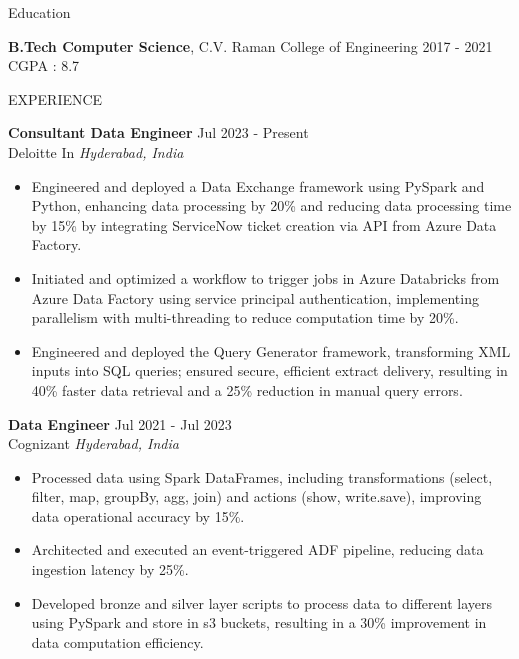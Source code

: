 \documentclass{resume} %
\begin{document}
\begin{rSection}{Education}

{\bf B.Tech Computer Science}, C.V. Raman College of Engineering   \hfill {2017 - 2021 }\\
CGPA : 8.7 
\end{rSection}
\begin{rSection}{EXPERIENCE}

\textbf{Consultant Data Engineer} \hfill Jul 2023 - Present\\
Deloitte In \hfill \textit{Hyderabad, India}
 \begin{itemize}
    \itemsep -3pt {} 

    \item Engineered and deployed a Data Exchange framework using PySpark and Python, enhancing data processing by 20\% and reducing data processing time by 15\% by integrating ServiceNow ticket creation via API from Azure Data Factory.
    \item Initiated and optimized a workflow to trigger jobs in Azure Databricks from Azure Data Factory using service principal authentication, implementing parallelism with multi-threading to reduce computation time by 20\%.
    \item Engineered and deployed the Query Generator framework, transforming XML inputs into SQL queries; ensured secure, efficient extract delivery, resulting in 40\% faster data retrieval and a 25\% reduction in manual query errors. 

 \end{itemize}
 
\textbf{Data Engineer } \hfill Jul 2021 - Jul 2023\\
Cognizant \hfill \textit{Hyderabad, India}
 \begin{itemize}
    \itemsep -3pt {}

    \item Processed data using Spark DataFrames, including transformations (select, filter, map, groupBy, agg, join) and actions (show, write.save), improving data operational accuracy by 15\%.
    \item Architected and executed an event-triggered ADF pipeline, reducing data ingestion latency by 25\%.
    \item Developed bronze and silver layer scripts to process data to different layers using PySpark and store in s3 buckets, resulting in a 30\% improvement in data computation efficiency. 
\end{itemize}

\end{rSection} 
\end{document}
